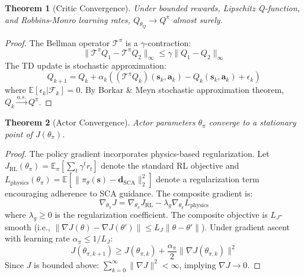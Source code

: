 \documentclass[journal]{IEEEtran}
\newtheorem{theorem}{Theorem}
\begin{document}
\begin{theorem}[Critic Convergence]
\label{thm:critic}
Under bounded rewards, Lipschitz Q-function, and Robbins-Monro learning rates, $Q_{\theta_Q} \to Q^\pi$ almost surely.
\end{theorem}

\begin{proof}
The Bellman operator $\mathcal{T}^\pi$ is a $\gamma$-contraction:
\begin{equation}
\|\mathcal{T}^\pi Q_1 - \mathcal{T}^\pi Q_2\|_\infty \leq \gamma \|Q_1 - Q_2\|_\infty
\end{equation}
The TD update is stochastic approximation:
\begin{equation}
Q_{k+1} = Q_k + \alpha_k ((\mathcal{T}^\pi Q_k)(\mathbf{s}_k, \mathbf{a}_k) - Q_k(\mathbf{s}_k, \mathbf{a}_k) + \epsilon_k)
\end{equation}
where $\mathbb{E}[\epsilon_k | \mathcal{F}_k] = 0$. By Borkar \& Meyn stochastic approximation theorem, $Q_k \xrightarrow{a.s.} Q^\pi$.
\end{proof}

\begin{theorem}[Actor Convergence]
\label{thm:actor}
Actor parameters $\theta_\pi$ converge to a stationary point of $J(\theta_\pi)$.
\end{theorem}

\begin{proof}
The policy gradient incorporates physics-based regularization. Let $J_{\text{RL}}(\theta_\pi) = \mathbb{E}_\pi[\sum_t \gamma^t r_t]$ denote the standard RL objective and $L_{\text{physics}}(\theta_\pi) = \mathbb{E}[\|\pi_\theta(\mathbf{s}) - \mathbf{d}_{\text{SCA}}\|_2^2]$ denote a regularization term encouraging adherence to SCA guidance. The composite gradient is:
\begin{equation}
\nabla_{\theta_\pi} J = \nabla_{\theta_\pi} J_{\text{RL}} - \lambda_g \nabla_{\theta_\pi} L_{\text{physics}}
\end{equation}
where $\lambda_g \geq 0$ is the regularization coefficient. The composite objective is $L_J$-smooth (i.e., $\|\nabla J(\theta) - \nabla J(\theta')\| \leq L_J \|\theta - \theta'\|$). Under gradient ascent with learning rate $\alpha_\pi \leq 1/L_J$:
\begin{equation}
J(\theta_{\pi,k+1}) \geq J(\theta_{\pi,k}) + \frac{\alpha_\pi}{2}\|\nabla J(\theta_{\pi,k})\|^2
\end{equation}
Since $J$ is bounded above: $\sum_{k=0}^\infty \|\nabla J\|^2 < \infty$, implying $\nabla J \to 0$.
\end{proof}
\end{document}
